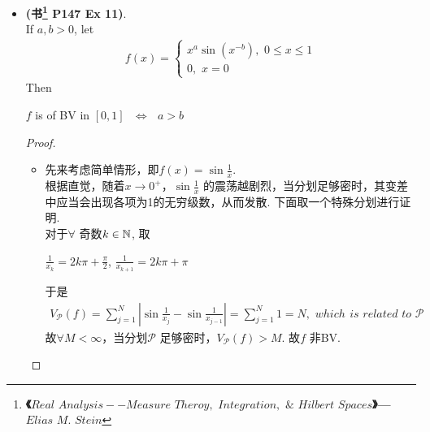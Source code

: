 \begin{example}
\begin{itemize}
			\item \textbf{(书\footnote{\textbf{《$Real \,\, Analysis -- Measure \,\, Theroy, \,\, Integration, \,\, \& \,\, Hilbert \,\, Spaces$》--- $Elias \,\, M. \,\, Stein$}} P147 Ex 11)}. \\
			If $a , b > 0$, let
			\begin{align}
				f(x) = 
				\begin{cases}
					x^{a} \sin{(x^{-b})} , \,\, 0 \leq x \leq 1 \\
					0 , \,\, x = 0
				\end{cases}
			\end{align}
			Then 
			\begin{center}
				$f$ is of BV in $[0 , 1]$ $\,\, \Leftrightarrow \,\, $ $a > b$
			\end{center}
		
			\vspace{2em}
			\begin{proof}
				\begin{itemize}
					\item 先来考虑简单情形，即$f(x) = \sin{\frac{1}{x}}$. \\
					根据直觉，随着$x \to 0^{+}$，$\sin{\frac{1}{x}}$ 的震荡越剧烈，当分划足够密时，其变差中应当会出现各项为1的无穷级数，从而发散. 下面取一个特殊分划进行证明. \\
					对于$\forall$ 奇数$k \in \mathbb{N}$, 取
					\begin{center}
						$\frac{1}{x_k} = 2k \pi + \frac{\pi}{2}$, $\frac{1}{x_{k + 1}} = 2k \pi + \pi$
					\end{center}
					于是
					\begin{align}
						V_{\mathcal{P}}(f) 
						= \sum_{j = 1}^{N}{\left| \sin{\frac{1}{x_j}} - \sin{\frac{1}{x_{j - 1}}} \right|}
						= \sum_{j = 1}^{N}{1}
						= N , \,\, which \,\ is \,\, related \,\, to \,\, \mathcal{P}
					\end{align}
					故$\forall M < \infty$，当分划$\mathcal{P}$ 足够密时，$V_{\mathcal{P}}(f) > M$. 故$f$ 非BV.
						
				\vspace{2em}
				

\end{itemize}
\end{proof}
\end{itemize}
\end{example}
